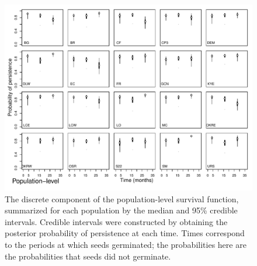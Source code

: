 \documentclass[12pt, oneside]{article}   	%
\begin{document}

 \begin{figure}[!h]
   \centering
       \includegraphics[page=1,width=1\textwidth]{../../figures/survival-function-discrete.pdf}  
    \caption{ The discrete component of the population-level survival function, summarized for each population by the median and 95\% credible intervals. Credible intervals were constructed by obtaining the posterior probability of persistence at each time. Times correspond to the periods at which seeds germinated; the probabilities here are the probabilities that seeds did not germinate.  }
 \label{fig:viability-estimates-population}
\end{figure}

\end{document}
